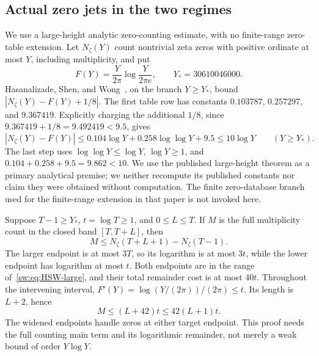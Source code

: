 \documentclass[11pt,a4paper]{article}
\numberwithin{equation}{section}
\theoremstyle{definition}\newtheorem{definition}[theorem]{Definition}
\theoremstyle{remark}\newtheorem{remark}[theorem]{Remark}
\begin{document}
\subsection{Actual zero jets in the two regimes}\label{sw:sec:zero}
We use a large-height analytic zero-counting estimate, with no finite-range zero-table extension. Let $N_\zeta(Y)$ count nontrivial zeta zeros with positive ordinate at most $Y$, including multiplicity, and put
\begin{equation}\label{sw:eq:RvM}
 F(Y)=\frac{Y}{2\pi}\log\frac{Y}{2\pi e},\qquad
 Y_*=30610046000.
\end{equation}
Hasanalizade, Shen, and Wong~\cite[Theorem 1.1 and Table 2]{HSW}, on the branch $Y\ge Y_*$, bound $|N_\zeta(Y)-F(Y)+1/8|$. The first table row has constants $0.103787$, $0.257297$, and $9.367419$. Explicitly charging the additional $1/8$, since $9.367419+1/8=9.492419<9.5$, gives
\begin{equation}\label{sw:eq:HSW-large}
 |N_\zeta(Y)-F(Y)|
 \le0.104\log Y+0.258\log\log Y+9.5
 \le10\log Y\qquad(Y\ge Y_*).
\end{equation}
The last step uses $\log\log Y\le\log Y$, $\log Y\ge1$, and $0.104+0.258+9.5=9.862<10$. We use the published large-height theorem as a primary analytical premise; we neither recompute its published constants nor claim they were obtained without computation. The finite zero-database branch used for the finite-range extension in that paper is not invoked here.

Suppose $T-1\ge Y_*$, $t=\log T\ge1$, and $0\le L\le T$. If $M$ is the full multiplicity count in the closed band $[T,T+L]$, then
\[
 M\le N_\zeta(T+L+1)-N_\zeta(T-1).
\]
The larger endpoint is at most $3T$, so its logarithm is at most $3t$, while the lower endpoint has logarithm at most $t$. Both endpoints are in the range of~\eqref{sw:eq:HSW-large}, and their total remainder cost is at most $40t$. Throughout the intervening interval,
$F'(Y)=\log(Y/(2\pi))/(2\pi)\le t$. Its length is $L+2$, hence
\begin{equation}\label{sw:eq:band-count}
 M\le(L+42)t\le42(L+1)t.
\end{equation}
The widened endpoints handle zeros at either target endpoint. This proof needs the full counting main term and its logarithmic remainder, not merely a weak bound of order $Y\log Y$.
\end{document}
